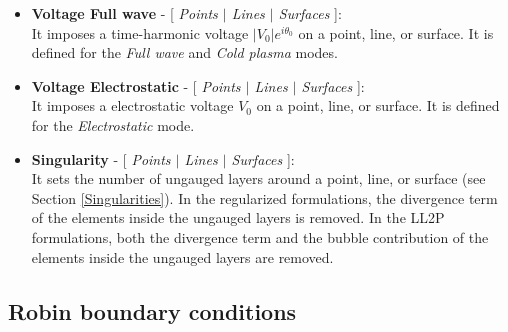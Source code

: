 \begin{itemize}
    Once the separate contact volumes are defined and its meshing disable, the PBCs can be applied. There are two pairs of PBC surfaces: \textbf{Front}-\textbf{Back} and \textbf{Left}-\textbf{Right}. The \textit{Front}-\textit{Back} surfaces must always lie parallel to the XY-plane. For cyclic periodic symmetries, the \textit{Left} surface must be positioned in the 00-YZ plane and the axis of rotation must align with the Z-axis.
    
    If PBCs are only required between parallel surfaces, separate contact volume elements can be used instead. If the contact volume mesh is retained, ERMES 20.0 will automatically enforce equal field values on the opposing facing nodes.
    
    This condition is not defined for edge element formulations. To enforce equal fields on two separate surfaces with edge elements, define separate contact volumes and ensure that the contact volumes are meshed to retain the coupling information. This approach will work for both parallel and cyclic periodic symmetry surfaces when using edge elements.
    \\
	\item \textbf{Voltage Full wave} - [ \textit{Points $\mid$ Lines $\mid$ Surfaces} ]:\\ 
	It imposes a time-harmonic voltage $|V_{0}|e^{i\theta_{0}}$ on a point, line, or surface. It is defined for the \textit{Full wave} and \textit{Cold plasma} modes.
    \\
	\item \textbf{Voltage Electrostatic} - [ \textit{Points $\mid$ Lines $\mid$ Surfaces} ]:\\
	It imposes a electrostatic voltage $V_{0}$ on a point, line, or surface. It is defined for the \textit{Electrostatic} mode.
	\\
	\item \textbf{Singularity} - [ \textit{Points $\mid$ Lines $\mid$ Surfaces} ]:\\
	It sets the number of ungauged layers around a point, line, or surface (see Section \ref{Singularities}). In the regularized formulations, the divergence term of the elements inside the ungauged layers is removed. In the LL2P formulations, both the divergence term and the bubble contribution of the elements inside the ungauged layers are removed.
\end{itemize}

\subsection{Robin boundary conditions}

